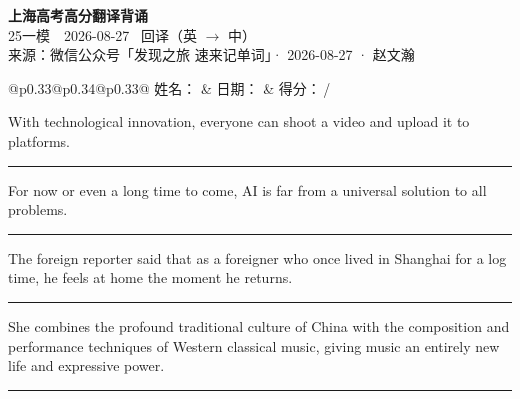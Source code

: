 \documentclass[11pt,a4paper]{article}
\newcommand{\num}[1]{\makebox[1.9em][r]{#1.}\hspace{0.3em}}
\newcommand{\wline}{\noindent\rule{\linewidth}{0.4pt}}
\begin{document}
\pagestyle{plain}
\begin{center}
{\LARGE\bfseries 上海高考高分翻译背诵 }\\[0.25em]
{\large 25一模　2026-08-27 \quad\ 回译（英 $\to$ 中）}\\[0.35em]
{\footnotesize 来源：微信公众号「发现之旅 速来记单词」· 2026-08-27 · 赵文瀚}
\end{center}

\vspace{0.4em}
\noindent\begin{tabular}{@{}p{0.33\textwidth}@{}p{0.34\textwidth}@{}p{0.33\textwidth}@{}}
姓名：\underline{\hspace{2.0cm}} & 日期：\underline{\hspace{2.0cm}} & 得分：\underline{\hspace{1.4cm}}\,/ \\
\end{tabular}

\vspace{0.5em}

\vspace{0.8em}
\num{1}With technological innovation, everyone can shoot a video and upload it to platforms.

\vspace{0.25em}

\wline

\num{2}For now or even a long time to come, AI is far from a universal solution to all problems.

\vspace{0.25em}

\wline

\num{3}The foreign reporter said that as a foreigner who once lived in Shanghai for a log time, he feels at home the moment he returns.

\vspace{0.25em}

\wline

\num{4}She combines the profound traditional culture of China with the composition and performance techniques of Western classical music, giving music an entirely new life and expressive power.

\vspace{0.25em}

\wline
\end{document}
